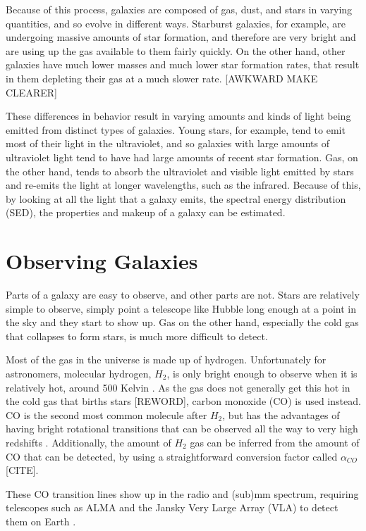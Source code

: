 \documentclass[twoside,single]{lion-msc}
\begin{document}
Because of this process, galaxies are composed of gas, dust, and stars in varying quantities, and so evolve in different ways. Starburst galaxies, for example, are undergoing massive amounts of star formation, and therefore are very bright and are using up the gas available to them fairly quickly. On the other hand, other galaxies have much lower masses and much lower star formation rates, that result in them depleting their gas at a much slower rate. [AWKWARD MAKE CLEARER]

These differences in behavior result in varying amounts and kinds of light being emitted from distinct types of galaxies. Young stars, for example, tend to emit most of their light in the ultraviolet, and so galaxies with large amounts of ultraviolet light tend to have had large amounts of recent star formation. Gas, on the other hand, tends to absorb the ultraviolet and visible light emitted by stars and re-emits the light at longer wavelengths, such as the infrared. Because of this, by looking at all the light that a galaxy emits, the spectral energy distribution (SED), the properties and makeup of a galaxy can be estimated.

\section{Observing Galaxies}

Parts of a galaxy are easy to observe, and other parts are not. Stars are relatively simple to observe, simply point a telescope like Hubble long enough at a point in the sky and they start to show up. Gas on the other hand, especially the cold gas that collapses to form stars, is much more difficult to detect. 

Most of the gas in the universe is made up of hydrogen. Unfortunately for astronomers, molecular hydrogen, $H_2$, is only bright enough to observe when it is relatively hot, around 500 Kelvin \cite{decarli2019alma}. As the gas does not generally get this hot in the cold gas that births stars [REWORD], carbon monoxide (CO) is used instead. CO is the second most common molecule after $H_2$, but has the advantages of having bright rotational transitions that can be observed all the way to very high redshifts \cite{walter2016alma, decarli2019alma}. Additionally, the amount of $H_2$ gas can be inferred from the amount of CO that can be detected, by using a straightforward conversion factor called $\alpha_{CO}$ [CITE]. 

These CO transition lines show up in the radio and (sub)mm spectrum, requiring telescopes such as ALMA and the Jansky Very Large Array (VLA) to detect them on Earth \cite{decarli2019alma}. 
\end{document}
